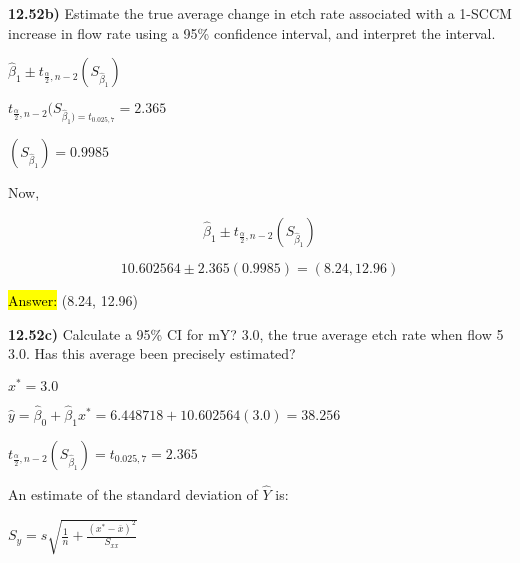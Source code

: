 \documentclass{article}
\begin{document}
\vspace{5mm}

\textbf{12.52b)} Estimate the true average change in etch rate associated with a 1-SCCM increase in flow rate using a 95\% confidence interval, and interpret the interval.

\vspace{2mm}

$\hat{\beta}_{1} \pm t_{\frac{\alpha}{2},n-2}(S_{\hat{\beta}_{1}})$

\vspace{2mm}


$t_{\frac{\alpha}{2},n-2}(S_{\hat{\beta}_{1})=t_{0.025, 7}}=2.365$

\vspace{2mm}

$(S_{\hat{\beta}_{1}})=0.9985$


Now,

$$\hat{\beta}_{1} \pm t_{\frac{\alpha}{2},n-2}(S_{\hat{\beta}_{1}})$$

$$10.602564 \pm 2.365(0.9985)=(8.24, 12.96)$$

\vspace{2mm}

\hl{Answer:} (8.24, 12.96)




\vspace{5mm}


\textbf{12.52c)} Calculate a 95\% CI for mY? 3.0, the true average etch rate when flow 5 3.0. Has this average been precisely estimated?

\vspace{2mm}


$x^{*}=3.0$

\vspace{2mm}

$\hat{y}=\hat{\beta}_{0}+\hat{\beta}_{1}x^{*}=6.448718+10.602564(3.0)=38.256$

\vspace{2mm}

$t_{\frac{\alpha}{2},n-2}(S_{\hat{\beta}_{1}})=t_{0.025, 7}=2.365$

\vspace{2mm}

An estimate of the standard deviation of $\hat{Y}$ is:

\vspace{2mm}

$S_{\hat{y}}=s\sqrt{\frac{1}{n}+\frac{(x^{*}-\overline{x})^{2}}{S_{xx}}}$

\vspace{2mm}
\end{document}
